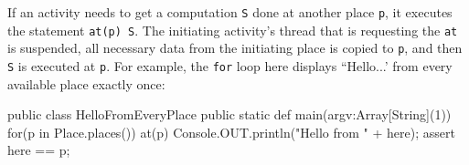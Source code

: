 
If an activity needs to get a computation {\tt S} done at another place {\tt p},
it executes the statement {\tt at(p) S}.  The initiating activity's thread that 
is requesting the {\tt at} is suspended, all necessary data from the initiating 
place is copied to {\tt p}, and then {\tt S} is executed at {\tt p}.  For
example, the {\tt for} loop here displays ``Hello...' from every available
place exactly once:
\begin{xtennum}[]
public class HelloFromEveryPlace {
  public static def main(argv:Array[String](1)) {
    for(p in Place.places()) { 
      at(p) {
        Console.OUT.println("Hello from " + here); 
        assert here == p;
      }
    }
  }
}
\end{xtennum}

